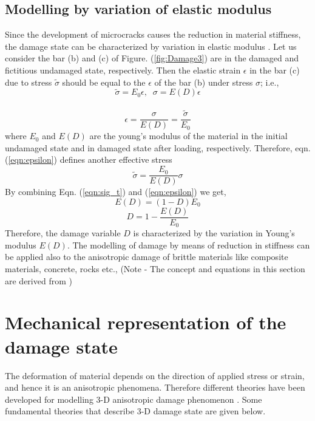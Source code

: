 \documentclass[12pt,a4paper,twoside,openright]{report}
\begin{document}
\subsection{Modelling by variation of elastic modulus} 
\indent\indent\indent Since the development of microcracks causes the reduction in material stiffness, the damage state can be characterized by variation in elastic modulus \citep{lemaitre1978aspect}. Let us consider the bar (b) and (c) of Figure. (\ref{fig:Damage3}) are in the damaged and fictitious undamaged state, respectively. Then the elastic strain $\epsilon$ in the bar (c) due to stress $\tilde{\sigma}$ should be equal to the $\epsilon$ of the bar (b) under stress $\sigma$; i.e.,\\
\begin{equation}
\label{eqn:sig_t2}
   \tilde{\sigma} = E_{0}\epsilon, \;\;  \sigma = E(D)\epsilon 
\end{equation}
\\
\begin{equation}
\label{eqn:epsilon}
\epsilon = \frac{\sigma}{E(D)} = \frac{\tilde{\sigma}}{E_{0}}
\end{equation}
where $E_{0}$ and $E(D)$ are the young's modulus of the material in the initial undamaged state and in damaged state after loading, respectively. Therefore, eqn. (\ref{eqn:epsilon}) defines another effective stress\\
\begin{equation}
\label{eqn:epsilon2}
  \tilde{\sigma} = \frac{E_{0}}{E(D)}\sigma
\end{equation}
By combining Eqn. (\ref{eqn:sig_t}) and (\ref{eqn:epsilon}) we get,
\begin{equation}
\label{eqn:E(d)}
E(D) = (1 - D) E_{0}
\end{equation}
\begin{equation}
\label{eqn:D2}
D  = 1 - \frac{E(D)}{E_{0}}
\end{equation}
Therefore, the damage variable $D$ is characterized by the variation in Young's modulus $E(D)$. The modelling of damage by means of reduction in stiffness can be applied also to the anisotropic damage of brittle materials like composite materials, concrete, rocks etc., (Note - The concept and equations in this section are derived from \citep{murakami2012continuum})


\section{Mechanical representation of the damage state}
\indent\indent\indent The deformation of material depends on the direction of applied stress or strain, and hence it is an anisotropic phenomena. Therefore different theories have been developed for modelling 3-D anisotropic damage phenomenon \citep{murakami2012continuum}. Some fundamental theories that describe 3-D damage state are given below. 
\end{document}

